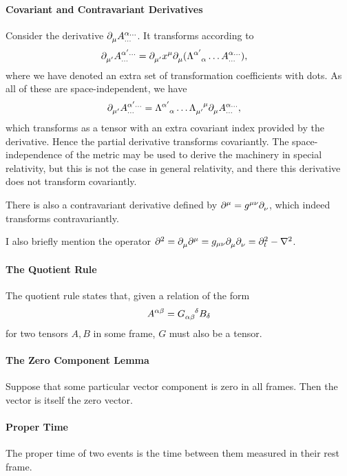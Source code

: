 \paragraph{Covariant and Contravariant Derivatives}
Consider the derivative $\del{\mu}{\tensor*{A}{^{\alpha\dots}_{\dots}}}$. It transforms according to
\begin{align*}
	\del{\mu\p}{\tensor*{A}{^{\alpha\p\dots}_{\dots}}} &= \del{\mu\p}{x^{\mu}}\del{\mu}{(\trcou{\alpha\p}{\alpha}\dots\tensor*{A}{^{\alpha\dots}_{\dots}})},
\end{align*}
where we have denoted an extra set of transformation coefficients with dots. As all of these are space-independent, we have
\begin{align*}
	\del{\mu\p}{\tensor*{A}{^{\alpha\p\dots}_{\dots}}} &= \trcou{\alpha\p}{\alpha}\dots\trcod{\mu\p}{\mu}\del{\mu}{\tensor*{A}{^{\alpha\dots}_{\dots}}},
\end{align*}
which transforms as a tensor with an extra covariant index provided by the derivative. Hence the partial derivative transforms covariantly. The space-independence of the metric may be used to derive the machinery in special relativity, but this is not the case in general relativity, and there this derivative does not transform covariantly.

There is also a contravariant derivative defined by $\del[\mu]{}{} = g^{\mu\nu}\del{\nu}{}$, which indeed transforms contravariantly.

I also briefly mention the operator $\del[2]{}{} = \del{\mu}{\del[\mu]{}{}} = g_{\mu\nu}\del{\mu}{\del{\nu}{}} = \del[2]{t}{} - \laplacian{}$. 

\paragraph{The Quotient Rule}
The quotient rule states that, given a relation of the form
\begin{align*}
	A^{\alpha\beta} = \tensor{G}{_{\alpha\beta}^{\delta}}B_{\delta}
\end{align*}
for two tensors $A, B$ in some frame, $G$ must also be a tensor.

\paragraph{The Zero Component Lemma}
Suppose that some particular vector component is zero in all frames. Then the vector is itself the zero vector.

\paragraph{Proper Time}
The proper time of two events is the time between them measured in their rest frame.

